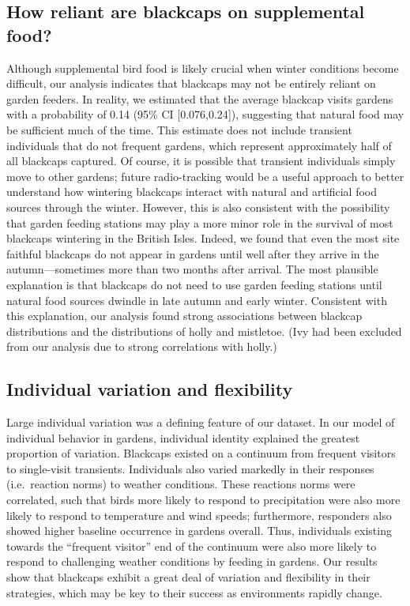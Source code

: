 \documentclass[a4paper, twoside]{templates/ociamthesis}
\begin{document}
\hypertarget{how-reliant-are-blackcaps-on-supplemental-food}{%
\subsection{How reliant are blackcaps on supplemental food?}\label{how-reliant-are-blackcaps-on-supplemental-food}}

Although supplemental bird food is likely crucial when winter conditions become difficult, our analysis indicates that blackcaps may not be entirely reliant on garden feeders. In reality, we estimated that the average blackcap visits gardens with a probability of 0.14 (95\% CI {[}0.076,0.24{]}), suggesting that natural food may be sufficient much of the time. This estimate does not include transient individuals that do not frequent gardens, which represent approximately half of all blackcaps captured. Of course, it is possible that transient individuals simply move to other gardens; future radio-tracking would be a useful approach to better understand how wintering blackcaps interact with natural and artificial food sources through the winter. However, this is also consistent with the possibility that garden feeding stations may play a more minor role in the survival of most blackcaps wintering in the British Isles. Indeed, we found that even the most site faithful blackcaps do not appear in gardens until well after they arrive in the autumn---sometimes more than two months after arrival. The most plausible explanation is that blackcaps do not need to use garden feeding stations until natural food sources dwindle in late autumn and early winter. Consistent with this explanation, our analysis found strong associations between blackcap distributions and the distributions of holly and mistletoe. (Ivy had been excluded from our analysis due to strong correlations with holly.)

\hypertarget{individual-variation-and-flexibility}{%
\subsection{Individual variation and flexibility}\label{individual-variation-and-flexibility}}

Large individual variation was a defining feature of our dataset. In our model of individual behavior in gardens, individual identity explained the greatest proportion of variation. Blackcaps existed on a continuum from frequent visitors to single-visit transients. Individuals also varied markedly in their responses (i.e.~reaction norms) to weather conditions. These reactions norms were correlated, such that birds more likely to respond to precipitation were also more likely to respond to temperature and wind speeds; furthermore, responders also showed higher baseline occurrence in gardens overall. Thus, individuals existing towards the ``frequent visitor'' end of the continuum were also more likely to respond to challenging weather conditions by feeding in gardens. Our results show that blackcaps exhibit a great deal of variation and flexibility in their strategies, which may be key to their success as environments rapidly change.
\end{document}

